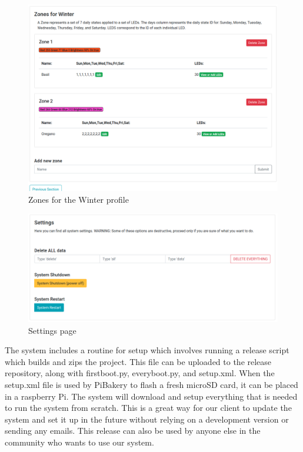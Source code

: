 \documentclass[onecolumn, draftclsnofoot,10pt, compsoc]{IEEEtran}
\begin{document}
	\begin{center}
		\begin{figure}[H]
			\includegraphics[width=\linewidth]{site/zones_winter.png}
			\caption{Zones for the Winter profile}
			\label{fig:siteZonesWinter}
		\end{figure}
	\end{center}
	\begin{center}
		\begin{figure}[H]
			\includegraphics[width=\linewidth]{site/settings.png}
			\caption{Settings page}
			\label{fig:siteSettings}
		\end{figure}
	\end{center}
	
	The system includes a routine for setup which involves running a release script which builds and zips the project.
	This file can be uploaded to the release repository, along with firstboot.py, everyboot.py, and setup.xml.
	When the setup.xml file is used by PiBakery to flash a fresh microSD card, it can be placed in a raspberry Pi.
	The system will download and setup everything that is needed to run the system from scratch.
	This is a great way for our client to update the system and set it up in the future without relying on a development version or sending any emails.
	This release can also be used by anyone else in the community who wants to use our system.
	
\end{document}

